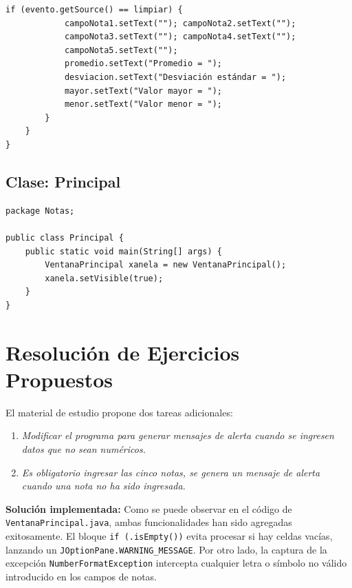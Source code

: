 \documentclass[12pt,a4paper]{article}
\begin{document}
\begin{lstlisting}[caption={Clase VentanaPrincipal.java}]
        if (evento.getSource() == limpiar) {
            campoNota1.setText(""); campoNota2.setText("");
            campoNota3.setText(""); campoNota4.setText("");
            campoNota5.setText("");
            promedio.setText("Promedio = ");
            desviacion.setText("Desviación estándar = ");
            mayor.setText("Valor mayor = ");
            menor.setText("Valor menor = ");
        }
    }
}
\end{lstlisting}

\subsection*{Clase: Principal}
\begin{lstlisting}[caption={Clase Principal.java}]
package Notas;

public class Principal {
    public static void main(String[] args) {
        VentanaPrincipal xanela = new VentanaPrincipal();
        xanela.setVisible(true);
    }
}
\end{lstlisting}

\section{Resolución de Ejercicios Propuestos}
El material de estudio propone dos tareas adicionales:
\begin{enumerate}
    \item \textit{Modificar el programa para generar mensajes de alerta cuando se ingresen datos que no sean numéricos.}
    \item \textit{Es obligatorio ingresar las cinco notas, se genera un mensaje de alerta cuando una nota no ha sido ingresada.}
\end{enumerate}
\textbf{Solución implementada:} Como se puede observar en el código de \texttt{VentanaPrincipal.java}, ambas funcionalidades han sido agregadas exitosamente. El bloque \texttt{if (.isEmpty())} evita procesar si hay celdas vacías, lanzando un \texttt{JOptionPane.WARNING\_MESSAGE}. Por otro lado, la captura de la excepción \texttt{NumberFormatException} intercepta cualquier letra o símbolo no válido introducido en los campos de notas.
\end{document}
